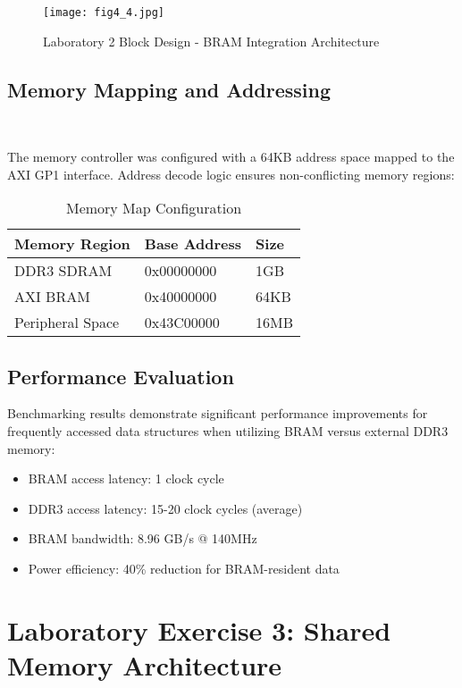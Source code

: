 \documentclass[11pt,a4paper]{article}
\begin{document}
\begin{figure}[H]
    \centering
    \texttt{[image: fig4\_4.jpg]}
    \caption{Laboratory 2 Block Design - BRAM Integration Architecture}
    \label{fig:lab2_block}
\end{figure}

\subsection{Memory Mapping and Addressing}\

The memory controller was configured with a 64KB address space mapped to the AXI GP1 interface. Address decode logic ensures non-conflicting memory regions:

\begin{table}[H]
    \centering
    \caption{Memory Map Configuration}
    \begin{tabular}{@{}lll@{}}
        \toprule
        \textbf{Memory Region} & \textbf{Base Address} & \textbf{Size} \\
        \midrule
        DDR3 SDRAM & 0x00000000 & 1GB \\
        AXI BRAM & 0x40000000 & 64KB \\
        Peripheral Space & 0x43C00000 & 16MB \\
        \bottomrule
    \end{tabular}
    \label{tab:memory_map}
\end{table}

\subsection{Performance Evaluation}

Benchmarking results demonstrate significant performance improvements for frequently accessed data structures when utilizing BRAM versus external DDR3 memory:

\begin{itemize}[leftmargin=*]
    \item BRAM access latency: 1 clock cycle
    \item DDR3 access latency: 15-20 clock cycles (average)
    \item BRAM bandwidth: 8.96 GB/s @ 140MHz
    \item Power efficiency: 40\% reduction for BRAM-resident data
\end{itemize}
\vspace{1em}
\section{Laboratory Exercise 3: Shared Memory Architecture}
\end{document}
